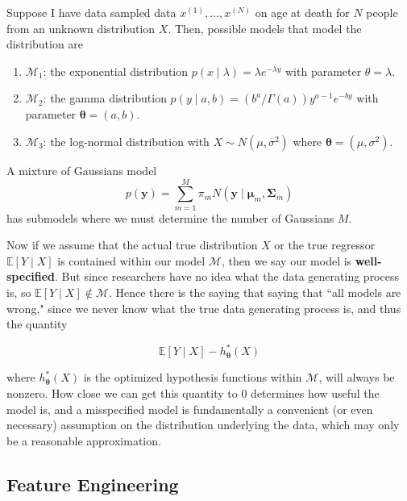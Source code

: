 \documentclass{article}
\begin{document}
    \begin{example}
      Suppose I have data sampled data $x^{(1)}, \ldots, x^{(N)}$ on age at death for $N$ people from an unknown distribution $X$. Then, possible models that model the distribution are 

      \begin{enumerate}
        \item $\mathcal{M}_1$: the exponential distribution $p(x \mid \lambda) = \lambda e^{-\lambda y}$ with parameter $\theta = \lambda$. 
        \item $\mathcal{M}_2$: the gamma distribution $p(y \mid a, b) = (b^a / \Gamma(a)) y^{a - 1} e^{- by}$ with parameter $\boldsymbol{\theta} = (a, b)$. 
        \item $\mathcal{M}_3$: the log-normal distribution with $X \sim N (\mu, \sigma^2)$ where ${\boldsymbol{\theta}} = (\mu, \sigma^2)$. 
      \end{enumerate}
    \end{example}

    \begin{example}
      A mixture of Gaussians model 
        \[p(\mathbf{y}) = \sum_{m=1}^M \pi_m N(\mathbf{y} \mid \boldsymbol{\mu}_m, \boldsymbol{\Sigma}_m )\]
      has submodels where we must determine the number of Gaussians $M$. 
    \end{example}

    Now if we assume that the actual true distribution $X$ or the true regressor $\mathbb{E}[Y\mid X]$ is contained within our model $\mathcal{M}$, then we say our model is \textbf{well-specified}. But since researchers have no idea what the data generating process is, so $\mathbb{E}[Y\mid X] \not\in \mathcal{M}$. Hence there is the saying that saying that ``all models are wrong," since we never know what the true data generating process is, and thus the quantity 

      \[\mathbb{E}[Y \mid X] - h_{\boldsymbol{\theta}}^\ast (X)\]

    where $h_{\boldsymbol{\theta}}^\ast (X)$ is the optimized hypothesis functions within $\mathcal{M}$, will always be nonzero. How close we can get this quantity to $0$ determines how useful the model is, and a misspecified model is fundamentally a convenient (or even necessary) assumption on the distribution underlying the data, which may only be a reasonable approximation. 

  \subsection{Feature Engineering} 
\end{document}
